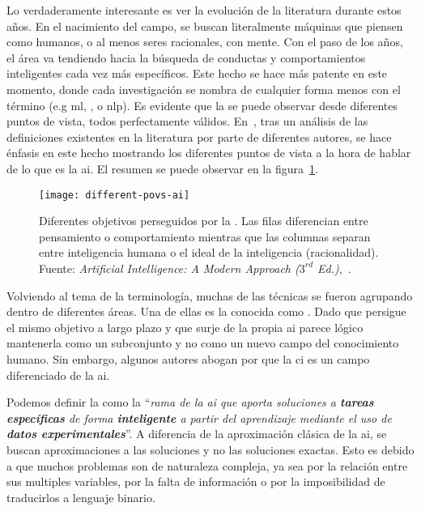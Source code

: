 Lo verdaderamente interesante es ver la evolución de la literatura durante estos años. En el nacimiento del campo, se buscan literalmente máquinas que piensen como humanos, o al menos seres racionales, con mente. Con el paso de los años, el área va tendiendo hacia la búsqueda de conductas y comportamientos inteligentes cada vez más específicos. Este hecho se hace más patente en este momento, donde cada investigación se nombra de cualquier forma menos con el término  (e.g \Acrfull{ml}, , o \Acrfull{nlp}). Es evidente que la  se puede observar desde diferentes puntos de vista, todos perfectamente válidos. En~\cite{russell2003artificial}, tras un análisis de las definiciones existentes en la literatura por parte de diferentes autores, se hace énfasis en este hecho mostrando los diferentes puntos de vista a la hora de hablar de lo que es la \gls{ai}. El resumen se puede observar en la figura~\ref{fig:different-povs-ai}.

\begin{figure}[t]
	\texttt{[image: different-povs-ai]}
	\caption[Diferentes objetivos perseguidos por la ]{Diferentes objetivos perseguidos por la . Las filas diferencian entre pensamiento o comportamiento mientras que las columnas separan entre inteligencia humana o el ideal de la inteligencia (racionalidad). Fuente: \textit{Artificial Intelligence: A Modern Approach ($3^{rd}$ Ed.)},~\cite{russell2003artificial}.}
	\label{fig:different-povs-ai}
\end{figure}

Volviendo al tema de la terminología, muchas de las técnicas se fueron agrupando dentro de diferentes áreas. Una de ellas es la conocida como . Dado que persigue el mismo objetivo a largo plazo y que surje de la propia \gls{ai} parece lógico mantenerla como un subconjunto y no como un nuevo campo del conocimiento humano. Sin embargo, algunos autores abogan por que la \gls{ci} es un campo diferenciado de la \gls{ai}.

Podemos definir la  como la \enquote{\textit{rama de la \gls{ai} que aporta soluciones a \textbf{tareas específicas} de forma \textbf{inteligente} a partir del aprendizaje mediante el uso de \textbf{datos experimentales}}}. A diferencia de la aproximación clásica de la \gls{ai}, se buscan aproximaciones a las soluciones y no las soluciones exactas. Esto es debido a que muchos problemas son de naturaleza compleja, ya sea por la relación entre sus multiples variables, por la falta de información o por la imposibilidad de traducirlos a lenguaje binario.

